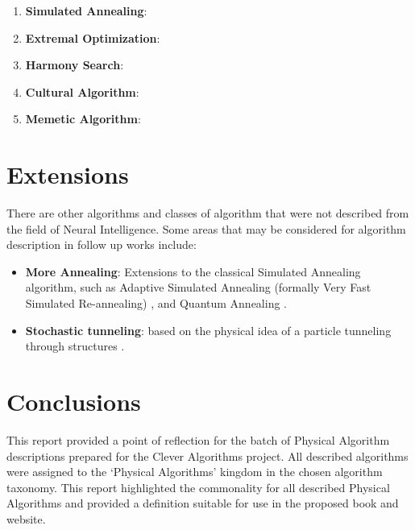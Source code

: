 \documentclass[a4paper, 11pt]{article}
\begin{document}
\begin{enumerate}
	\item \textbf{Simulated Annealing}: \cite{Brownlee2010ak}
	\item \textbf{Extremal Optimization}: \cite{Brownlee2010al}
	\item \textbf{Harmony Search}: \cite{Brownlee2010am}
	\item \textbf{Cultural Algorithm}: \cite{Brownlee2010an}
	\item \textbf{Memetic Algorithm}: \cite{Brownlee2010ao}
\end{enumerate}

% 
% 
\section{Extensions}
\label{sec:extensions}
There are other algorithms and classes of algorithm that were not described from the field of Neural Intelligence. Some areas that may be considered for algorithm description in follow up works include:

\begin{itemize}
	\item \textbf{More Annealing}: Extensions to the classical Simulated Annealing algorithm, such as Adaptive Simulated Annealing (formally Very Fast Simulated Re-annealing) \cite{Ingber1989, Ingber1996}, and Quantum Annealing \cite{Apolloni1989, Das2005}.
	\item \textbf{Stochastic tunneling}: based on the physical idea of a particle tunneling through structures \cite{Wenzel1999}.
\end{itemize}

% 
% 
\section{Conclusions}
\label{sec:conclusions}
This report provided a point of reflection for the batch of Physical Algorithm descriptions prepared for the Clever Algorithms project. All described algorithms were assigned to the `Physical Algorithms' kingdom in the chosen algorithm taxonomy. This report highlighted the commonality for all described Physical Algorithms and provided a definition suitable for use in the proposed book and website.



\end{document}
